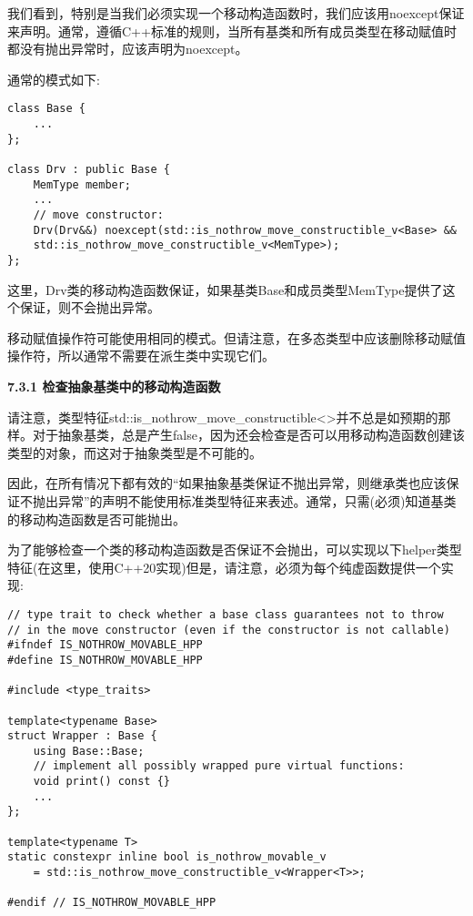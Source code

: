 我们看到，特别是当我们必须实现一个移动构造函数时，我们应该用noexcept保证来声明。通常，遵循C++标准的规则，当所有基类和所有成员类型在移动赋值时都没有抛出异常时，应该声明为noexcept。\par

通常的模式如下:\par

\begin{lstlisting}[caption={}]
class Base {
	...
};

class Drv : public Base {
	MemType member;
	...
	// move constructor:
	Drv(Drv&&) noexcept(std::is_nothrow_move_constructible_v<Base> &&
	std::is_nothrow_move_constructible_v<MemType>);
};
\end{lstlisting}

这里，Drv类的移动构造函数保证，如果基类Base和成员类型MemType提供了这个保证，则不会抛出异常。\par

移动赋值操作符可能使用相同的模式。但请注意，在多态类型中应该删除移动赋值操作符，所以通常不需要在派生类中实现它们。\par

\hspace*{\fill} \par %
\textbf{7.3.1 检查抽象基类中的移动构造函数}

请注意，类型特征std::is\_nothrow\_move\_constructible<>并不总是如预期的那样。对于抽象基类，总是产生false，因为还会检查是否可以用移动构造函数创建该类型的对象，而这对于抽象类型是不可能的。\par

因此，在所有情况下都有效的“如果抽象基类保证不抛出异常，则继承类也应该保证不抛出异常”的声明不能使用标准类型特征来表述。通常，只需(必须)知道基类的移动构造函数是否可能抛出。\par

为了能够检查一个类的移动构造函数是否保证不会抛出，可以实现以下helper类型特征(在这里，使用C++20实现)但是，请注意，必须为每个纯虚函数提供一个实现:\par

{\color{red}{poly/isnothrowmovable.hpp}}\par

\begin{lstlisting}[caption={}]
// type trait to check whether a base class guarantees not to throw
// in the move constructor (even if the constructor is not callable)
#ifndef IS_NOTHROW_MOVABLE_HPP
#define IS_NOTHROW_MOVABLE_HPP

#include <type_traits>

template<typename Base>
struct Wrapper : Base {
	using Base::Base;
	// implement all possibly wrapped pure virtual functions:
	void print() const {}
	...
};

template<typename T>
static constexpr inline bool is_nothrow_movable_v
	= std::is_nothrow_move_constructible_v<Wrapper<T>>;

#endif // IS_NOTHROW_MOVABLE_HPP
\end{lstlisting}

